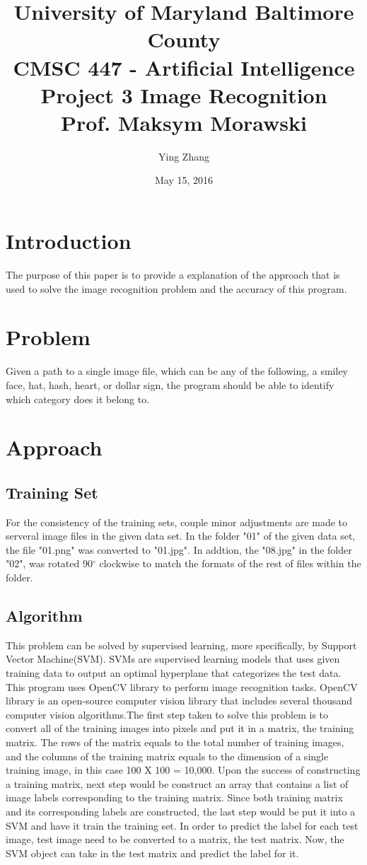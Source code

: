 \documentclass[a4paper]{article}
\title{University of Maryland Baltimore County \\
CMSC 447 - Artificial Intelligence \\
Project 3 Image Recognition \\
Prof. Maksym Morawski}
\author{Ying Zhang }
\date{May 15, 2016}
\begin{document}
\maketitle

\section{Introduction}

The purpose of this paper is to provide a explanation of the approach that is used to solve the image recognition problem and the accuracy of this program. 

\section{Problem}

Given a path to a single image file, which can be any of the following, a smiley face, hat, hash, heart, or dollar sign, the program should be able to identify which category does it belong to.

\section{Approach}
\subsection{Training Set}
For the consistency of the training sets, couple minor adjustments are made to serveral image files in the given data set. In the folder "01" of the given data set, the file "01.png" was converted to "01.jpg". In addtion, the "08.jpg" in the folder "02", was rotated 90$^{\circ}$ clockwise to match the formats of the rest of files within the folder.

\subsection{Algorithm}
This problem can be solved by supervised learning, more specifically, by Support Vector Machine(SVM). SVMs are supervised learning models that uses given training data to output an optimal hyperplane that categorizes the test data. This program uses OpenCV library to perform image recognition tasks. OpenCV library is an open-source computer vision library that includes several thousand computer vision algorithms.The first step taken to solve this problem is to convert all of the training images into pixels and put it in a matrix, the training matrix. The rows of the matrix equals to the total number of training images, and the columns of the training matrix equals to the dimension of a single training image, in this case 100 X 100 = 10,000. Upon the success of constructing a training matrix, next step would be construct an array that contains a list of image labels corresponding to the training matrix. Since both training matrix and its corresponding labels are constructed, the last step would be put it into a SVM and have it train the training set. In order to predict the label for each test image, test image need to be converted to a matrix, the test matrix. Now, the SVM object can take in the test matrix and predict the label for it.
\end{document}
